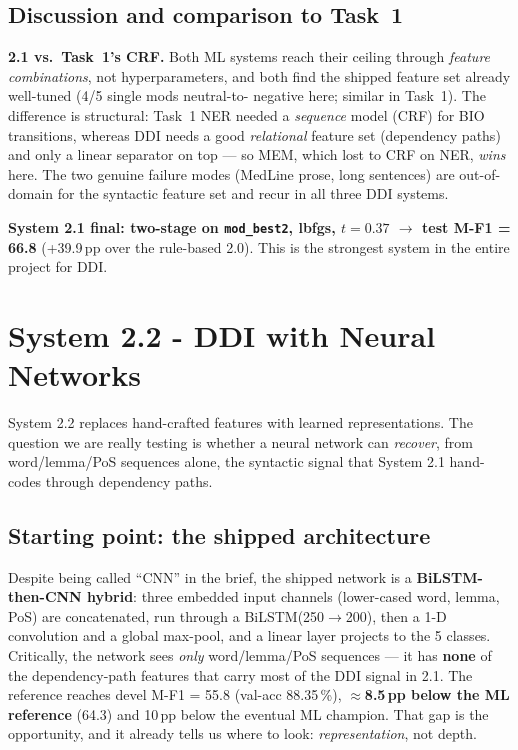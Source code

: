 \documentclass[a4paper,11pt]{article}
\begin{document}
\subsection{Discussion and comparison to Task~1}
\begin{cmpbox}\small
\textbf{2.1 vs.\ Task~1's CRF.} Both ML systems reach their ceiling
through \emph{feature combinations}, not hyperparameters, and both find
the shipped feature set already well-tuned (4/5 single mods neutral-to-
negative here; similar in Task~1). The difference is structural: Task~1
NER needed a \emph{sequence} model (CRF) for BIO transitions, whereas
DDI needs a good \emph{relational} feature set (dependency paths) and
only a linear separator on top --- so MEM, which lost to CRF on NER,
\emph{wins} here. The two genuine failure modes (MedLine prose, long
sentences) are out-of-domain for the syntactic feature set and recur in
all three DDI systems.
\end{cmpbox}

\noindent\textbf{System 2.1 final: two-stage on \texttt{mod\_best2},
lbfgs, $t{=}0.37$ $\to$ test M-F1 = 66.8} (+39.9\,pp over the rule-based
2.0). This is the strongest system in the entire project for DDI.

\section{System 2.2 - DDI with Neural Networks}\label{sec:nn}

System 2.2 replaces hand-crafted features with learned representations.
The question we are really testing is whether a neural network can
\emph{recover}, from word/lemma/PoS sequences alone, the syntactic
signal that System 2.1 hand-codes through dependency paths.

\subsection{Starting point: the shipped architecture}
Despite being called ``CNN'' in the brief, the shipped network is a
\textbf{BiLSTM-then-CNN hybrid}: three embedded input channels
(lower-cased word, lemma, PoS) are concatenated, run through a
BiLSTM(250$\to$200), then a 1-D convolution and a global max-pool, and a
linear layer projects to the 5 classes. Critically, the network sees
\emph{only} word/lemma/PoS sequences --- it has \textbf{none} of the
dependency-path features that carry most of the DDI signal in 2.1. The
reference reaches devel M-F1 = 55.8 (val-acc 88.35\,\%),
\textbf{$\approx$8.5\,pp below the ML reference} (64.3) and 10\,pp below
the eventual ML champion. That gap is the opportunity, and it already
tells us where to look: \emph{representation}, not depth.
\end{document}
